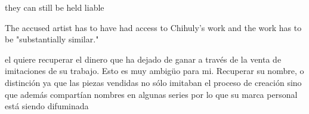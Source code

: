 they can still be held liable

The accused artist has to have had access to Chihuly's work and the work has to be "substantially similar."

el quiere recuperar el dinero que ha dejado de ganar a través de la venta de imitaciones de su trabajo. Esto es muy ambigüo para mi.
Recuperar su nombre, o distinción ya que las piezas vendidas no sólo imitaban el proceso de creación sino que además compartían nombres en algunas series por lo que su marca personal está siendo difuminada